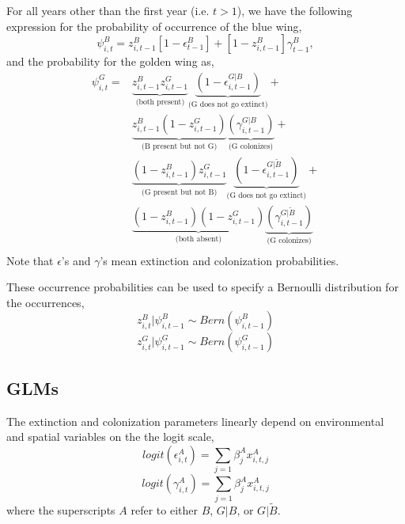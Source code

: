 \documentclass{article}
\begin{document}
For all years other than the first year (i.e. $t > 1$), we have the
following expression for the probability of occurrence of the blue
wing,
\begin{equation}
  \label{eq:6}
  \psi_{i,t}^B = z_{i,t-1}^B [1-\epsilon_{t-1}^B] + [1-z_{i,t-1}^B] \gamma_{t-1}^B,
\end{equation}
and the probability for the golden wing as,
\begin{equation}
  \label{eq:8}
  \begin{split}
    \psi_{i,t}^G = & \underbrace{z_{i,t-1}^B z_{i,t-1}^G}_{\text{(both
        present)}}
    \underbrace{(1-\epsilon_{i,t-1}^{G|B})}_{\text{(G does not go extinct)}} + \\
    & \underbrace{z_{i,t-1}^B (1-z_{i,t-1}^G)}_{\text{(B present but not G)}}
    \underbrace{(\gamma_{i,t-1}^{G|B})}_{\text{(G colonizes)}} + \\
      & \underbrace{(1-z_{i,t-1}^B) z_{i,t-1}^G}_{\text{(G present but
          not B)}}
      \underbrace{(1-\epsilon_{i,t-1}^{G|\tilde{B}})}_{\text{(G does not go extinct)}} +\\
      & \underbrace{(1-z_{i,t-1}^B)(1-z_{i,t-1}^G)}_{\text{(both absent)}}
      \underbrace{(\gamma_{i,t-1}^{G|\tilde{B}})}_{\text{(G colonizes)}} \\
  \end{split}
\end{equation}
Note that $\epsilon$'s and $\gamma$'s mean extinction and colonization
probabilities.

These occurrence probabilities can be used to specify a Bernoulli
distribution for the occurrences,
\begin{equation}
  \label{eq:1}
  z_{i,t}^B | \psi_{i,t-1}^B \sim Bern(\psi_{i,t-1}^B)
\end{equation}
\begin{equation}
  \label{eq:2}
  z_{i,t}^G | \psi_{i,t-1}^G \sim Bern(\psi_{i,t-1}^G)
\end{equation}


\subsection{GLMs}

The extinction and colonization parameters linearly depend on
environmental and spatial variables on the the logit scale,
\begin{equation}
  \label{eq:7}
  logit(\epsilon_{i, t}^A) = \sum_{j=1} \beta_j^A x_{i, t, j}^A
\end{equation}
\begin{equation}
  \label{eq:7}
  logit(\gamma_{i, t}^A) = \sum_{j=1} \beta_j^A x_{i, t, j}^A
\end{equation}
where the superscripts $A$ refer to either $B$, $G|B$, or $G|\tilde{B}$.
\end{document}

